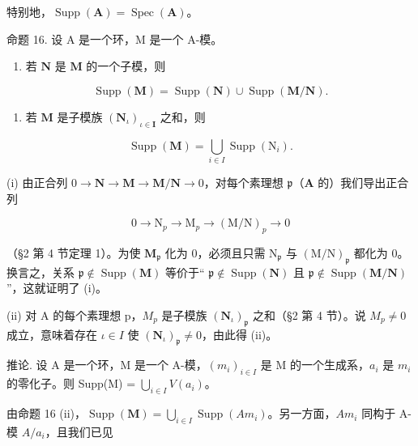 特别地，\(\operatorname{Supp}(\mathbf{A}) = \operatorname{Spec}(\mathbf{A})\)。

命题 16. 设 A 是一个环，M 是一个 A-模。

\begin{enumerate}
\def\labelenumi{(\roman{enumi})}
\tightlist
\item
  若 \(\mathbf{N}\) 是 \(\mathbf{M}\) 的一个子模，则
\end{enumerate}

\[
\operatorname{Supp} (\mathbf {M}) = \operatorname{Supp} (\mathbf {N}) \cup \operatorname{Supp} (\mathbf {M} / \mathbf {N}).
\]

\begin{enumerate}
\def\labelenumi{(\roman{enumi})}
\setcounter{enumi}{1}
\tightlist
\item
  若 \(\mathbf{M}\) 是子模族 \((\mathbf{N}_{\iota})_{\iota \in \mathbf{I}}\) 之和，则
\end{enumerate}

\[
\operatorname{Supp} (\mathbf {M}) = \bigcup_ {i \in I} \operatorname{Supp} \left(\mathrm{N} _ {i}\right).
\]

(i) 由正合列 \(0 \to \mathbf{N} \to \mathbf{M} \to \mathbf{M} / \mathbf{N} \to 0\)，对每个素理想 \(\mathfrak{p}\)（\(\mathbf{A}\) 的）我们导出正合列

\[
0 \rightarrow \mathrm{N} _ {p} \rightarrow \mathrm{M} _ {p} \rightarrow (\mathrm{M} / \mathrm{N}) _ {p} \rightarrow 0
\]

（§2 第 4 节定理 1）。为使 \(\mathbf{M}_{\mathfrak{p}}\) 化为 0，必须且只需 \(\mathrm{N}_{\mathfrak{p}}\) 与 \((\mathrm{M} / \mathrm{N})_{\mathfrak{p}}\) 都化为 0。换言之，关系 \(\mathfrak{p} \notin \operatorname{Supp}(\mathbf{M})\) 等价于`` \(\mathfrak{p} \notin \operatorname{Supp}(\mathbf{N})\) 且 \(\mathfrak{p} \notin \operatorname{Supp}(\mathbf{M} / \mathbf{N})\) ''，这就证明了 (i)。

(ii) 对 A 的每个素理想 p，\(M_{p}\) 是子模族 \((\mathbf{N}_{\iota})_{\mathfrak{p}}\) 之和（§2 第 4 节）。说 \(M_{p} \neq 0\) 成立，意味着存在 \(\iota \in I\) 使 \((\mathbf{N}_{\iota})_{\mathfrak{p}} \neq 0\)，由此得 (ii)。

推论. 设 A 是一个环，M 是一个 A-模，\((m_{i})_{i\in I}\) 是 M 的一个生成系，\(a_{i}\) 是 \(m_{i}\) 的零化子。则 Supp(M) = \(\bigcup_{i\in I} V(a_{i})\)。

由命题 16 (ii)，\(\operatorname{Supp}(\mathbf{M}) = \bigcup_{i \in I} \operatorname{Supp}(Am_i)\)。另一方面，\(Am_i\) 同构于 A-模 \(A/a_i\)，且我们已见

